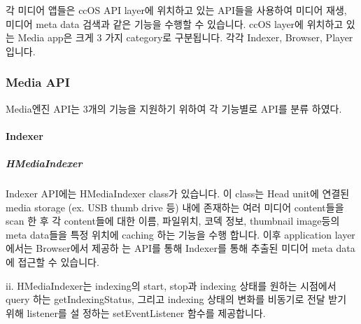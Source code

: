 각 미디어 앱들은 ccOS API layer에 위치하고 있는 API들을 사용하여 미디어 재생, 미디어 meta data 검색과 같은 기능을 수행할 수 있습니다. ccOS layer에 위치하고 있는 Media app은 크게 3 가지 category로 구분됩니다. 각각 Indexer, Browser, Player 입니다.
\subsubsection*{Media API}
Media엔진 API는 3개의 기능을 지원하기 위하여 각 기능별로 API를 분류 하였다.
\paragraph{Indexer} 
\subparagraph{HMediaIndexer}
Indexer API에는 HMediaIndexer class가 있습니다. 이 class는 Head unit에 연결된 media storage (ex. USB thumb drive 등) 내에 존재하는 여러 미디어 content들을 scan 한 후 각 content들에 대한 이름, 파일위치, 코덱 정보, thumbnail image등의 meta data들을 특정 위치에 caching 하는 기능을 수행 합니다. 이후 application layer에서는 Browser에서 제공하 는 API를 통해 Indexer를 통해 추출된 미디어 meta data에 접근할 수 있습니다.

ii. HMediaIndexer는 indexing의 start, stop과 indexing 상태를 원하는 시점에서 query 하는 getIndexingStatus, 그리고 indexing 상태의 변화를 비동기로 전달 받기 위해 listener를 설 정하는 setEventListener 함수를 제공합니다.

